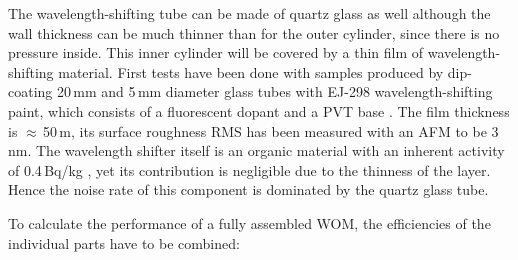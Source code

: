 The wavelength-shifting tube can be made of quartz glass as well although the 
wall thickness can be much thinner than for the outer cylinder, since there is 
no pressure inside. This inner cylinder will be covered by a thin film of 
wavelength-shifting material.
First tests have been done with samples produced by dip-coating 20\,mm and 5\,mm 
diameter glass tubes with EJ-298 wavelength-shifting paint, which consists of a 
fluorescent dopant and a PVT base \cite{paintprops}. The film thickness is 
$\approx$\,50\,\textmu m, its surface roughness RMS has been measured with an 
AFM to be 3\,nm. The wavelength shifter itself is an organic material with an 
inherent activity of 0.4\,Bq/kg \cite{pvtnoise}, yet its contribution is 
negligible due to the thinness of the layer. Hence the noise rate of this 
component is dominated by the quartz glass tube. 

To calculate the performance of a fully assembled WOM, the efficiencies of the  
individual parts have to be combined:


